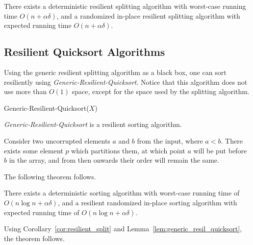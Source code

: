 \documentclass{llncs}
\begin{document}
\begin{corollary}
\label{cor:resilient_split}
There exists a deterministic resilient splitting algorithm with worst-case running time $O(n+\alpha\delta)$, and a randomized in-place resilient splitting algorithm with expected running time $O(n+\alpha\delta)$.
\end{corollary}




\subsection{Resilient Quicksort Algorithms}
Using the generic resilient splitting algorithm as a black box, one can sort resiliently using \emph{Generic-Resilient-Quicksort}. Notice that this algorithm does not use more than $O(1)$ space, except for the space used by the splitting algorithm.\\


\begin{algorithm}[H]
\label{alg:Resil_quicksort}

\caption{Generic-Resilient-Quicksort($X$)}
\end{algorithm}


\begin{lemma}\label{lem:generic_resil_quicksort}
\emph{Generic-Resilient-Quicksort} is a resilient sorting algorithm.
\end{lemma}

\begin{pf}
Consider two uncorrupted elements $a$ and $b$ from the input, where $a<b$. There exists some element $p$ which partitions them, at which point $a$ will be put before $b$ in the array, and from then onwards their order will remain the same.
\end{pf}


The following theorem follows.

\begin{theorem}
There exists a deterministic sorting algorithm with worst-case running time of $O(n\log n+\alpha\delta)$, and a resilient randomized in-place sorting algorithm with expected running time of $O(n\log n+\alpha\delta)$.
\end{theorem}

\begin{pf}
Using Corollary~\ref{cor:resilient_split} and Lemma~\ref{lem:generic_resil_quicksort}, the theorem follows.
\end{pf}















\newpage



\end{document}
